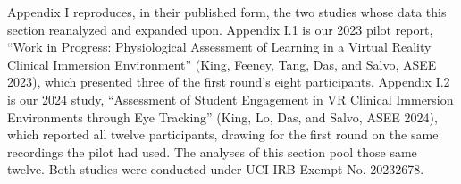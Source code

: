 %

Appendix I reproduces, in their published form, the two studies whose data this section
reanalyzed and expanded upon. Appendix I.1 is our 2023 pilot report, ``Work in Progress:
Physiological Assessment of Learning in a Virtual Reality Clinical Immersion Environment''
(King, Feeney, Tang, Das, and Salvo, ASEE 2023), which presented three of the first round's
eight participants. Appendix I.2 is our 2024 study, ``Assessment of Student Engagement in VR
Clinical Immersion Environments through Eye Tracking'' (King, Lo, Das, and Salvo, ASEE 2024),
which reported all twelve participants, drawing for the first round on the same recordings
the pilot had used. The analyses of this section pool those same twelve. Both studies were
conducted under UCI IRB Exempt No. 20232678.


